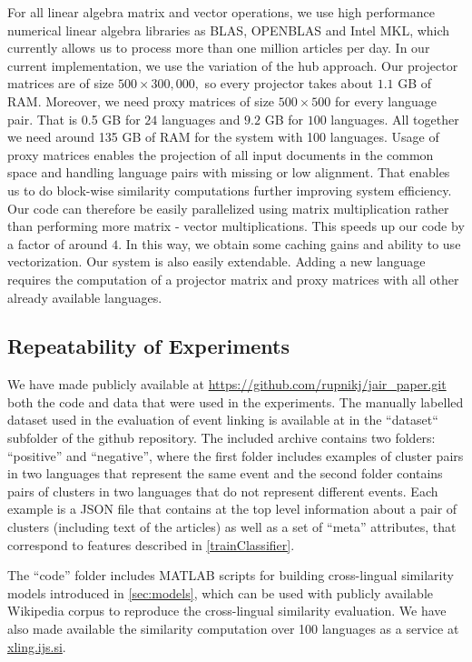 \documentclass[twoside,11pt]{article}
\begin{document}
For all linear algebra matrix and vector operations, we use high performance numerical linear algebra libraries as BLAS, OPENBLAS and Intel MKL, which currently allows us to process more than one million articles per day.
In our current implementation, we use the variation of the hub approach. Our projector matrices are of size $500\times 300,000,$ so every projector takes about $1.1$ GB of RAM. Moreover, we need proxy matrices of size $500\times500$ for every language pair. That is 0.5 GB for $24$ languages and $9.2$ GB for $100$ languages. All together we need around 135 GB of RAM for the system with 100 languages.
 Usage of proxy matrices enables the projection of all input documents in the common space and handling language pairs with missing or low alignment. That enables us to do block-wise similarity computations further improving system efficiency. Our code can therefore be easily parallelized using matrix multiplication rather than performing more matrix - vector multiplications. This speeds up our code by a factor of around $4.$ In this way, we obtain some caching gains and ability to use vectorization.
Our system is also easily extendable. Adding a new language requires the  computation of  a projector matrix and proxy matrices with all other already available languages.

\subsection{Repeatability of Experiments}
We have made publicly available at \url{https://github.com/rupnikj/jair_paper.git} both the code and data that were used in the experiments.
The manually labelled dataset used in the evaluation of event linking is available at in the ``dataset`` subfolder of the github repository. The included archive contains two folders: ``positive'' and ``negative'', where the first folder includes examples of cluster pairs in two languages that represent the same event and the second folder contains pairs of clusters in two languages that do not represent different events. Each example is a JSON file that contains at the top level information about a pair of clusters (including text of the articles) as well as a set of ``meta'' attributes, that correspond to features described in \ref{trainClassifier}.

The ``code'' folder includes MATLAB scripts for building cross-lingual similarity models introduced in \ref{sec:models}, which can be used with publicly available Wikipedia corpus to reproduce the cross-lingual similarity evaluation. We have also made available the similarity computation over 100 languages as a service at \url{xling.ijs.si}.
\end{document}
